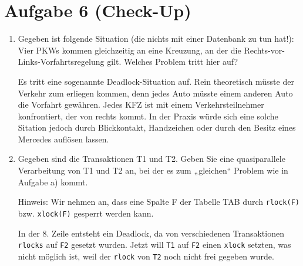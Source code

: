 \section{Aufgabe 6 (Check-Up)}

\begin{enumerate}


\item Gegeben ist folgende Situation (die nichts mit einer Datenbank zu
tun hat!): Vier PKWs kommen gleichzeitig an eine Kreuzung, an der die
Rechts-vor-Links-Vorfahrtsregelung gilt. Welches Problem tritt hier auf?

\begin{mdframed}
Es tritt eine sogenannte Deadlock-Situation auf. Rein theoretisch müsste
der Verkehr zum erliegen kommen, denn jedes Auto müsste einem anderen
Auto die Vorfahrt gewähren. Jedes KFZ ist mit einem Verkehrsteilnehmer
konfrontiert, der von rechts kommt. In der Praxis würde sich eine solche
Sitation jedoch durch Blickkontakt, Handzeichen oder durch den Besitz
eines Mercedes auflösen lassen.
\end{mdframed}


\item Gegeben sind die Transaktionen T1 und T2. Geben Sie eine
quasiparallele Verarbeitung von T1 und T2 an, bei der es zum „gleichen“
Problem wie in Aufgabe a) kommt.

Hinweis: Wir nehmen an, dass eine Spalte F der Tabelle TAB durch
\texttt{rlock(F)} bzw. \texttt{xlock(F)} gesperrt werden kann.

\begin{mdframed}

In der 8. Zeile entsteht ein Deadlock, da von verschiedenen
Transaktionen \texttt{rlocks} auf \texttt{F2} gesetzt wurden. Jetzt will
\texttt{T1} auf \texttt{F2} einen \texttt{xlock} setzten, was nicht
möglich ist, weil der \texttt{rlock} von \texttt{T2} noch nicht frei
gegeben wurde.


\end{mdframed}
\end{enumerate}
